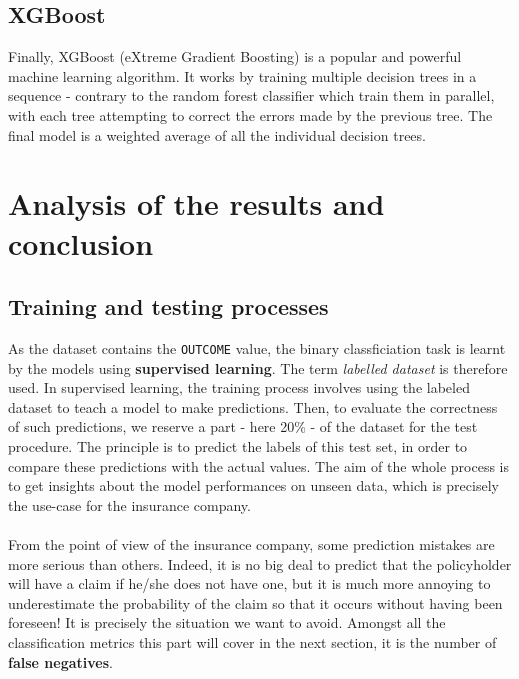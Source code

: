 \documentclass[a4paper,11pt, titlepage]{article}
\begin{document}
\subsection{XGBoost}

Finally, XGBoost (eXtreme Gradient Boosting) is a popular and powerful machine learning algorithm. It works by training multiple decision trees in a sequence - contrary to the random forest classifier which train them in parallel, with each tree attempting to correct the errors made by the previous tree. The final model is a weighted average of all the individual decision trees.



\section{Analysis of the results and conclusion} \label{results}

\subsection{Training and testing processes}

As the dataset contains the {\tt OUTCOME} value, the binary classficiation task is learnt by the models using \textbf{supervised learning}. The term \textsl{labelled dataset} is therefore used. In supervised learning, the training process involves using the labeled dataset to teach a model to make predictions. Then, to evaluate the correctness of such predictions, we reserve a part - here 20\% - of the dataset for the test procedure. The principle is to predict the labels of this test set, in order to compare these predictions with the actual values. The aim of the whole process is to get insights about the model performances on unseen data, which is precisely the use-case for the insurance company.\\
\\
\noindent From the point of view of the insurance company, some prediction mistakes are more serious than others. Indeed, it is no big deal to predict that the policyholder will have a claim if he/she does not have one, but it is much more annoying to underestimate the probability of the claim so that it occurs without having been foreseen! It is precisely the situation we want to avoid. Amongst all the classification metrics this part will cover in the next section, it is the number of \textbf{false negatives}.
\end{document}
